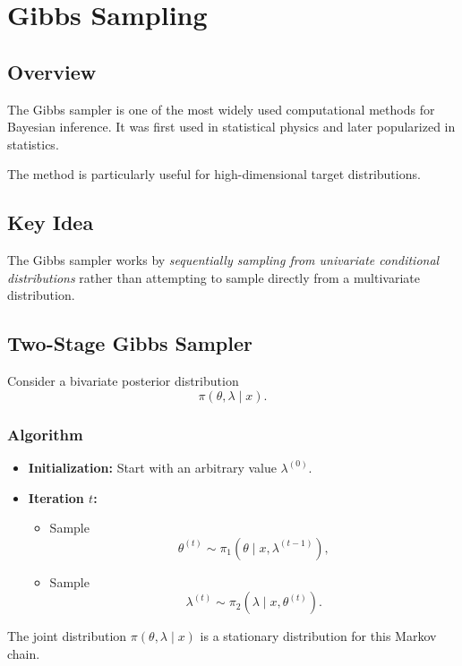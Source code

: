 \documentclass[12pt,oneside]{book}
\numberwithin{equation}{section}
\theoremstyle{definition}
\theoremstyle{plain}
\theoremstyle{remark}
\begin{document}
\section{Gibbs Sampling}

\subsection{Overview}

The Gibbs sampler is one of the most widely used computational methods for Bayesian inference. It was first used in statistical physics and later popularized in statistics.

The method is particularly useful for high-dimensional target distributions.

\subsection{Key Idea}

The Gibbs sampler works by \emph{sequentially sampling from univariate conditional distributions} rather than attempting to sample directly from a multivariate distribution.

\subsection{Two-Stage Gibbs Sampler}

Consider a bivariate posterior distribution
\[
\pi(\theta, \lambda \mid x).
\]

\subsubsection*{Algorithm}

\begin{itemize}
\item \textbf{Initialization:} Start with an arbitrary value $\lambda^{(0)}$.

\item \textbf{Iteration $t$:}
\begin{itemize}
\item Sample
\[
\theta^{(t)} \sim \pi_1(\theta \mid x, \lambda^{(t-1)}),
\]
\item Sample
\[
\lambda^{(t)} \sim \pi_2(\lambda \mid x, \theta^{(t)}).
\]
\end{itemize}
\end{itemize}

The joint distribution $\pi(\theta, \lambda \mid x)$ is a stationary distribution for this Markov chain.
\end{document}
